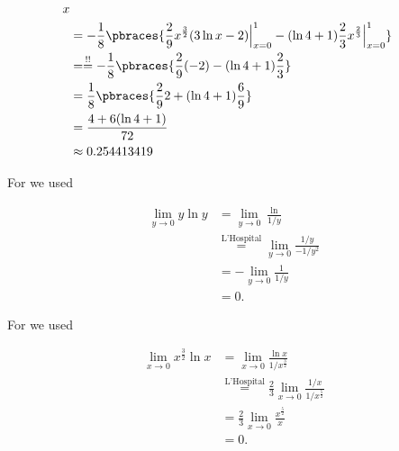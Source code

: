 \begin{solution}
\begin{enumerate}[label = (\alph*)]
\begin{enumerate}[label = \arabic*.]
\begin{align*}
{{                }{x}
            } \\
            & =
            -\frac{1}{8}
            \pbraces
            {
                \frac{2}{9}
                x^\frac{3}{2}
                (
                    3 \ln x - 2
                )
                \Big |_{x=0}^1
                -
                (
                    \ln 4 + 1
                )
                \frac{2}{3}
                x^\frac{2}{3}
                \Big |_{x=0}^1
            } \\
            & =
            \stackrel{!!}{=}
            -\frac{1}{8}
            \pbraces
            {
                \frac{2}{9}
                (-2)
                -
                (
                    \ln 4 + 1
                )
                \frac{2}{3}
            } \\
            & =
            \frac{1}{8}
            \pbraces
            {
                \frac{2}{9}
                2
                +
                (
                    \ln 4 + 1
                )
                \frac{6}{9}
            } \\
            & =
            \frac
            {
                4 + 6 (\ln 4 + 1)
            }{
                72
            } \\
            & \approx
            0.254413419
        \end{align*}

        For \Quote{!} we used

        \begin{align*}
            \lim_{y \to 0}
                y \ln y
            & =
            \lim_{y \to 0}
                \frac{\ln}{1 / y} \\
            & \stackrel
            {
                \text{L'Hospital}
            }{=}
            \lim_{y \to 0}
                \frac{1 / y}{-1 / y^2} \\
            & =
            -\lim_{y \to 0}
                \frac{1}{1 / y} \\
            & =
            0.
        \end{align*}

        For \Quote{!!} we used

        \begin{align*}
            \lim_{x \to 0}
                x^\frac{3}{2} \ln x
            & =
            \lim_{x \to 0}
                \frac{\ln x}{1 / x^\frac{3}{2}} \\
            & \stackrel
            {
                \text{L'Hospital}
            }{=}
            \frac{2}{3}
            \lim_{x \to 0}
                \frac{1 / x}{1 / x^\frac{5}{2}} \\
            & =
            \frac{2}{3}
            \lim_{x \to 0}
                \frac{x^\frac{5}{2}}{x} \\
            & =
            0.
        \end{align*}


\end{enumerate}
\end{enumerate}
\end{solution}
